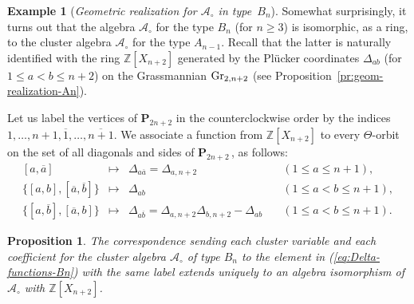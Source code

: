 \documentclass[letterpaper]{amsart}
\numberwithin{equation}{section}
\newtheorem{proposition}[theorem]{Proposition}
\theoremstyle{definition}
\newtheorem{example}[theorem]{Example}
\def\AA{\mathcal{A}}
\def\ZZ{\mathbb{Z}}
\def\Poly{\mathbf{P}}
\begin{document}
\begin{example} 
[\emph{Geometric realization for $\AA_\circ$ in type~$B_n$}] 
\label{ex:realization-Bn} 
Somewhat surprising\-ly, it turns out that the algebra 
$\AA_\circ$ for the type $B_n$ (for $n\geq 3$) is isomorphic, as a 
ring, to the cluster algebra $\AA_\circ$ for the type $A_{n-1}$. 
Recall that the latter is naturally identified with 
the ring $\ZZ[X_{n+2}]$ generated by the Pl\"ucker coordinates 
$\Delta_{ab}$ (for $1 \leq a < b \leq n+2$) on the Grassmannian ${\rm Gr}_{2,n+2}$ 
(see Proposition~\ref{pr:geom-realization-An}). 
 
Let us label the vertices of 
$\Poly_{2n+2}$ in the counterclockwise order by the indices 
$1, \dots, n+1, \overline 1, \dots, \overline {n+1}$. 
We associate a function from $\ZZ[X_{n+2}]$ to every 
$\Theta$-orbit on the set of all diagonals and sides of 
$\Poly_{2n+2}\,$, as follows: 
\begin{equation} 
\label{eq:Delta-functions-Bn} 
\begin{array}{rcll} 
[a, \overline a]  &\mapsto& \Delta_{a \overline a} = \Delta_{a,n+2} 
  &\quad (1 \leq a \leq n+1),\\[.05in] 
\{[a,b], [\overline a, \overline b]\} &\mapsto& \Delta_{ab} 
  &\quad (1 \leq a < b \leq n+1),\\[.05in] 
\{[a,\overline b], [\overline a, b]\} &\mapsto& 
\Delta_{a \overline b} = 
\Delta_{a,n+2} \Delta_{b,n+2} - \Delta_{ab} 
  &\quad (1 \leq a < b \leq n+1). 
\end{array} 
\end{equation} 
 
\begin{proposition} 
\label{pr:geom-realization-Bn} 
The correspondence sending each cluster variable 
and each coefficient for the cluster algebra $\AA_\circ$ 
of type $B_n$ to the element in {\rm (\ref{eq:Delta-functions-Bn})} 
with the same label extends uniquely to an algebra isomorphism of 
$\AA_\circ$ with $\ZZ[X_{n+2}]$. 
\end{proposition} 
 

\end{example}
\end{document}
